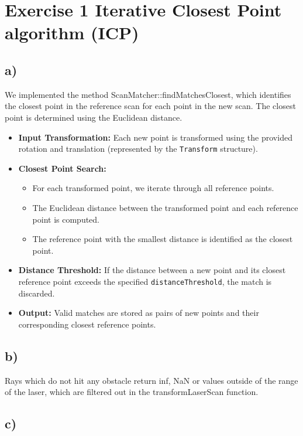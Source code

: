 \documentclass[template,12pt,a4paper,enabledeprecatedfontcommands]{template}
\begin{document}
\vspace*{-1em}

\section{Exercise 1 Iterative Closest Point algorithm (ICP)}


\subsection{a)}

We implemented the method ScanMatcher::findMatchesClosest, which identifies the closest point in the reference scan for each point in the new scan. The closest point is determined using the Euclidean distance.

\begin{itemize}
    \item \textbf{Input Transformation:} Each new point is transformed using the provided rotation and translation (represented by the \texttt{Transform} structure).
    \item \textbf{Closest Point Search:}
    \begin{itemize}
        \item For each transformed point, we iterate through all reference points.
        \item The Euclidean distance between the transformed point and each reference point is computed.
        \item The reference point with the smallest distance is identified as the closest point.
    \end{itemize}
    \item \textbf{Distance Threshold:} If the distance between a new point and its closest reference point exceeds the specified \texttt{distanceThreshold}, the match is discarded.
    \item \textbf{Output:} Valid matches are stored as pairs of new points and their corresponding closest reference points.
\end{itemize}


\subsection{b)}
Rays which do not hit any obstacle return inf, NaN  or values outside of the range of the laser, which are filtered out in the transformLaserScan function.


\subsection{c)}
\end{document}
